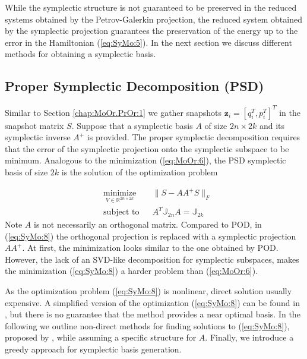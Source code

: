 While the symplectic structure is not guaranteed to be preserved in the reduced systems obtained by the Petrov-Galerkin projection, the reduced system obtained by the symplectic projection guarantees the preservation of the energy up to the error in the Hamiltonian (\ref{eq:SyMo:5}). In the next section we discuss  different methods for obtaining a symplectic basis.

\subsection{Proper Symplectic Decomposition (PSD)} \label{chap:SyMo.PrSy:1}

Similar to Section \ref{chap:MoOr.PrOr:1} we gather snapshots $\mathbf z_i = [q_i^T , p_i^T]^T$ in the snapshot matrix $S$. Suppose that a symplectic basis $A$ of size $2n\times2k$ and its symplectic inverse $A^+$ is provided. The proper symplectic decomposition requires that the error of the symplectic projection onto the symplectic subspace to be minimum. Analogous to the minimization (\ref{eq:MoOr:6}), the PSD symplectic basis of size $2k$ is the solution of the optimization problem

\begin{equation} \label{eq:SyMo:8}
\begin{aligned}
& \underset{V\in \mathbb R^{2n\times 2k}}{\text{minimize}}
& & \| S - AA^+S\|_F \\
& \text{subject to}
& & A^T \mathbb{J}_{2n}A = \mathbb{J}_{2k}
\end{aligned}
\end{equation}
Note $A$ is not necessarily an orthogonal matrix. Compared to POD, in (\ref{eq:SyMo:8}) the orthogonal projection is replaced with a symplectic projection $AA^+$. At first, the minimization looks similar to the one obtained by POD. However, the lack of an SVD-like decomposition for symplectic subspaces, makes the minimization (\ref{eq:SyMo:8}) a harder problem than (\ref{eq:MoOr:6}). 

As the optimization problem (\ref{eq:SyMo:8}) is nonlinear, direct solution usually expensive. A simplified version of the optimization (\ref{eq:SyMo:8}) can be found in \cite{Peng:2014di}, but there is no guarantee that the method provides a near optimal basis. In the following we outline non-direct methods for finding solutions to (\ref{eq:SyMo:8}), proposed by \cite{Peng:2014di}, while assuming a specific structure for $A$. Finally, we introduce a greedy approach for symplectic basis generation.

